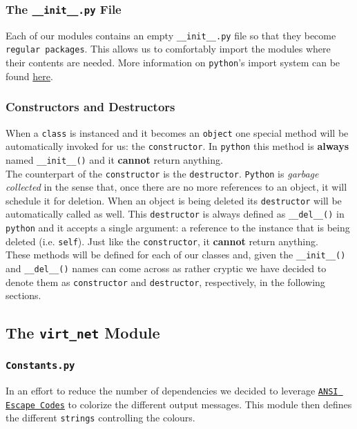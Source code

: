             \subsubsection{The \texttt{\_\_init\_\_.py} File}
                Each of our modules contains an empty \texttt{\_\_init\_\_.py} file so that they become \texttt{regular packages}. This allows us to comfortably import the modules where their contents are needed. More information on \texttt{python}'s import system can be found \href{https://docs.python.org/3/reference/import.html#regular-packages}{here}.

            \subsubsection{Constructors and Destructors}
                When a \texttt{class} is instanced and it becomes an \texttt{object} one special method will be automatically invoked for us: the \texttt{constructor}. In \texttt{python} this method is \textbf{always} named \texttt{\_\_init\_\_()} and it \textbf{cannot} return anything.\\

                The counterpart of the \texttt{constructor} is the \texttt{destructor}. \texttt{Python} is \textit{garbage collected} in the sense that, once there are no more references to an object, it will schedule it for deletion. When an object is being deleted its \texttt{destructor} will be automatically called as well. This \texttt{destructor} is always defined as \texttt{\_\_del\_\_()} in \texttt{python} and it accepts a single argument: a reference to the instance that is being deleted (i.e. \texttt{self}). Just like the \texttt{constructor}, it \textbf{cannot} return anything.\\

                These methods will be defined for each of our classes and, given the \texttt{\_\_init\_\_()} and \texttt{\_\_del\_\_()} names can come across as rather cryptic we have decided to denote them as \texttt{constructor} and \texttt{destructor}, respectively, in the following sections.\\

        \subsection{The \texttt{virt\_net} Module}
            \subsubsection{\texttt{Constants.py}}
                In an effort to reduce the number of dependencies we decided to leverage \href{https://en.wikipedia.org/wiki/ANSI_escape_code}{\texttt{ANSI Escape Codes}} to colorize the different output messages. This module then defines the different \texttt{strings} controlling the colours.

